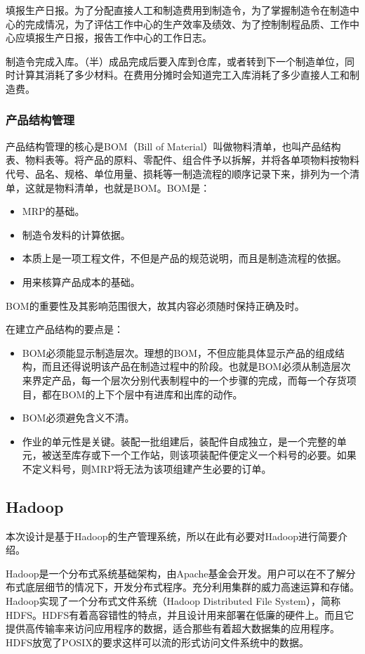 \documentclass{Proposal}
\begin{document}
填报生产日报。为了分配直接人工和制造费用到制造令，为了掌握制造令在制造中心的完成情况，为了评估工作中心的生产效率及绩效、为了控制制程品质、工作中心应填报生产日报，报告工作中心的工作日志。

制造令完成入库。（半）成品完成后要入库到仓库，或者转到下一个制造单位，同时计算其消耗了多少材料。在费用分摊时会知道完工入库消耗了多少直接人工和制造费。

\subsubsection{产品结构管理}

产品结构管理的核心是BOM（Bill of Material）叫做物料清单，也叫产品结构表、物料表等。将产品的原料、零配件、组合件予以拆解，并将各单项物料按物料代号、品名、规格、单位用量、损耗等一制造流程的顺序记录下来，排列为一个清单，这就是物料清单，也就是BOM。BOM是：
\begin{itemize}
\item MRP的基础。
\item 制造令发料的计算依据。
\item 本质上是一项工程文件，不但是产品的规范说明，而且是制造流程的依据。
\item 用来核算产品成本的基础。
\end{itemize}

BOM的重要性及其影响范围很大，故其内容必须随时保持正确及时。

在建立产品结构的要点是：
\begin{itemize}
\item BOM必须能显示制造层次。理想的BOM，不但应能具体显示产品的组成结构，而且还得说明该产品在制造过程中的阶段。也就是BOM必须从制造层次来界定产品，每一个层次分别代表制程中的一个步骤的完成，而每一个存货项目，都在BOM的上下个层中有进库和出库的动作。
\item BOM必须避免含义不清。
\item 作业的单元性是关键。装配一批组建后，装配件自成独立，是一个完整的单元，被送至库存或下一个工作站，则该项装配件便定义一个料号的必要。如果不定义料号，则MRP将无法为该项组建产生必要的订单。
\end{itemize}

\subsection{Hadoop}

本次设计是基于Hadoop的生产管理系统，所以在此有必要对Hadoop进行简要介绍。

Hadoop是一个分布式系统基础架构，由Apache基金会开发。用户可以在不了解分布式底层细节的情况下，开发分布式程序。充分利用集群的威力高速运算和存储。Hadoop实现了一个分布式文件系统（Hadoop Distributed File System），简称HDFS。HDFS有着高容错性的特点，并且设计用来部署在低廉的硬件上。而且它提供高传输率来访问应用程序的数据，适合那些有着超大数据集的应用程序。HDFS放宽了POSIX的要求这样可以流的形式访问文件系统中的数据。
\end{document}
